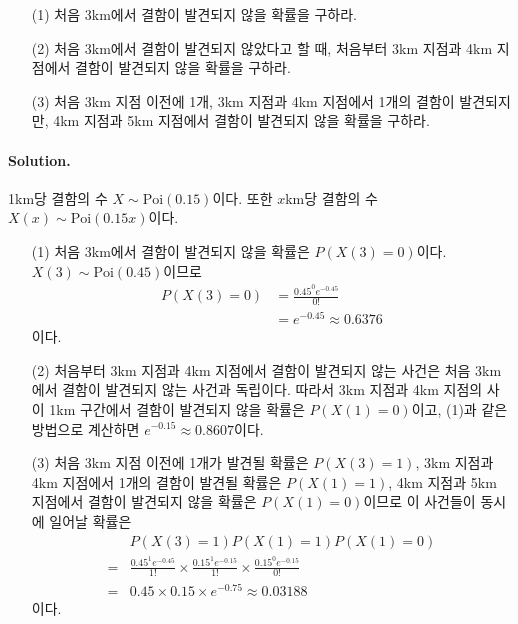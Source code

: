 \begin{itemize}
	\item [(1)] 처음 3km에서 결함이 발견되지 않을 확률을 구하라.
	\item [(2)] 처음 3km에서 결함이 발견되지 않았다고 할 때, 처음부터 3km 지점과 4km 지점에서 결함이 발견되지 않을 확률을 구하라.
	\item [(3)] 처음 3km 지점 이전에 1개, 3km 지점과 4km 지점에서 1개의 결함이 발견되지만, 4km 지점과 5km 지점에서 결함이 발견되지 않을 확률을 구하라.
\end{itemize}

\paragraph{Solution.} 1km당 결함의 수 $X \sim \mathrm{Poi}\left(0.15\right)$이다.
또한 $x$km당 결함의 수 $X\left(x\right) \sim \mathrm{Poi}\left(0.15x\right)$이다.

\begin{itemize}
	\item [(1)] {
		처음 3km에서 결함이 발견되지 않을 확률은 $P\left(X\left(3\right) = 0\right)$이다.
		$X\left(3\right) \sim \mathrm{Poi}\left(0.45\right)$이므로
		\begin{align*}
			P\left(X\left(3\right)=0\right) &= \frac{0.45^0 e^{-0.45}}{0!}\\
			&= e^{-0.45} \approx 0.6376
		\end{align*}
		이다.
	}
	\item [(2)] {
		처음부터 3km 지점과 4km 지점에서 결함이 발견되지 않는 사건은 처음 3km에서 결함이 발견되지 않는 사건과 독립이다. 따라서 3km 지점과 4km 지점의 사이 1km 구간에서
		결함이 발견되지 않을 확률은 $P\left(X\left(1\right) = 0\right)$이고, (1)과 같은 방법으로 계산하면 $e^{-0.15} \approx 0.8607$이다.
	}
	\item [(3)] {
		처음 3km 지점 이전에 1개가 발견될 확률은 $P\left(X\left(3\right) = 1\right)$,
		3km 지점과 4km 지점에서 1개의 결함이 발견될 확률은 $P\left(X\left(1\right) = 1\right)$,
		4km 지점과 5km 지점에서 결함이 발견되지 않을 확률은 $P\left(X\left(1\right) = 0\right)$이므로 이 사건들이 동시에 일어날 확률은
		\begin{align*}
			& P\left(X\left(3\right) = 1\right)P\left(X\left(1\right) = 1\right)P\left(X\left(1\right) = 0\right) \\
			=& \frac{0.45^1 e^{-0.45}}{1!} \times \frac{0.15^1 e^{-0.15}}{1!} \times \frac{0.15^0 e^{-0.15}}{0!} \\
			=& 0.45 \times 0.15 \times e^{-0.75} \approx 0.03188
		\end{align*}
		이다.
	}
\end{itemize}

